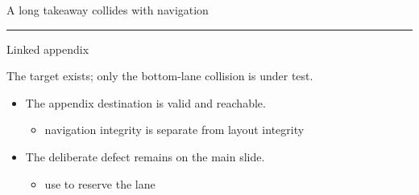 \documentclass[11pt,aspectratio=169]{beamer}
\begin{document}
\begin{frame}{A long takeaway collides with navigation}
  \centering
  \rule{0.78\textwidth}{0.53\textheight}
  \vspace*{6em}
  \hypertarget{main:here}{}%
\end{frame}
\AppendixStart
\begin{frame}{Linked appendix}
  \hypertarget{app:there}{}%
  \begin{ResultBox}[Target]
    The target exists; only the bottom-lane collision is under test.
  \end{ResultBox}
  \begin{itemize}
    \item The appendix destination is valid and reachable.
      \begin{itemize}\item navigation integrity is separate from layout integrity\end{itemize}
    \item The deliberate defect remains on the main slide.
      \begin{itemize}\item use \texttt{\string\TakeawayWithNav} to reserve the lane\end{itemize}
  \end{itemize}
\end{frame}
\end{document}
